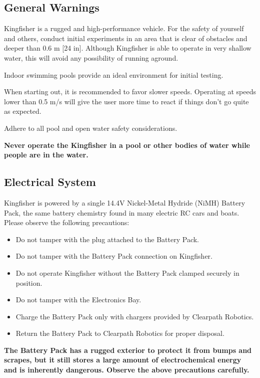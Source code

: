 \documentclass[]{clearpath-latex/clearpath-manual}
\begin{document}
\subsection{General Warnings}
Kingfisher is a rugged and high-performance vehicle. For the safety of yourself and others, conduct initial experiments in an area that is clear of obstacles and deeper than 0.6 m [24 in]. Although Kingfisher is able to operate in very shallow water, this will avoid any possibility of running aground.

Indoor swimming pools provide an ideal environment for initial testing.

When starting out, it is recommended to favor slower speeds. Operating at speeds lower than 0.5 m/s will give the user more time to react if things don’t go quite as expected.

Adhere to all pool and open water safety considerations.

\textbf{Never operate the Kingfisher in a pool or other bodies of water while people are in the water.}

\subsection{Electrical System}
Kingfisher is powered by a single 14.4V Nickel-Metal Hydride (NiMH) Battery Pack, the same battery chemistry found in many electric RC cars and boats. Please observe the following precautions:

\begin{itemize}[nolistsep]
	\item Do not tamper with the plug attached to the Battery Pack.
	\item Do not tamper with the Battery Pack connection on Kingfisher.
	\item Do not operate Kingfisher without the Battery Pack clamped securely in position.
	\item Do not tamper with the Electronics Bay.
	\item Charge the Battery Pack only with chargers provided by Clearpath Robotics.
	\item Return the Battery Pack to Clearpath Robotics for proper disposal.
\end{itemize}

\textbf{The Battery Pack has a rugged exterior to protect it from bumps and scrapes, but it still stores a large amount of electrochemical energy and is inherently dangerous. Observe the above precautions carefully.}
\end{document}
